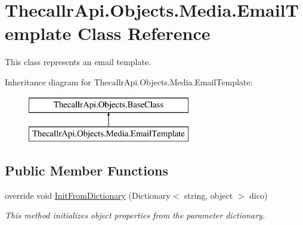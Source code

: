 \hypertarget{class_thecallr_api_1_1_objects_1_1_media_1_1_email_template}{\section{Thecallr\+Api.\+Objects.\+Media.\+Email\+Template Class Reference}
\label{class_thecallr_api_1_1_objects_1_1_media_1_1_email_template}
}


This class represents an email template.  


Inheritance diagram for Thecallr\+Api.\+Objects.\+Media.\+Email\+Template\+:\begin{figure}[H]
\begin{center}
\leavevmode
\includegraphics[height=2.000000cm]{class_thecallr_api_1_1_objects_1_1_media_1_1_email_template}
\end{center}
\end{figure}
\subsection*{Public Member Functions}
\begin{DoxyCompactItemize}
\item 
override void \hyperlink{class_thecallr_api_1_1_objects_1_1_media_1_1_email_template_a0439e8d3c5b13e544196073f798e8cab}{Init\+From\+Dictionary} (Dictionary$<$ string, object $>$ dico)
\begin{DoxyCompactList}\small\item\em This method initializes object properties from the parameter dictionary. \end{DoxyCompactList}\end{DoxyCompactItemize}
